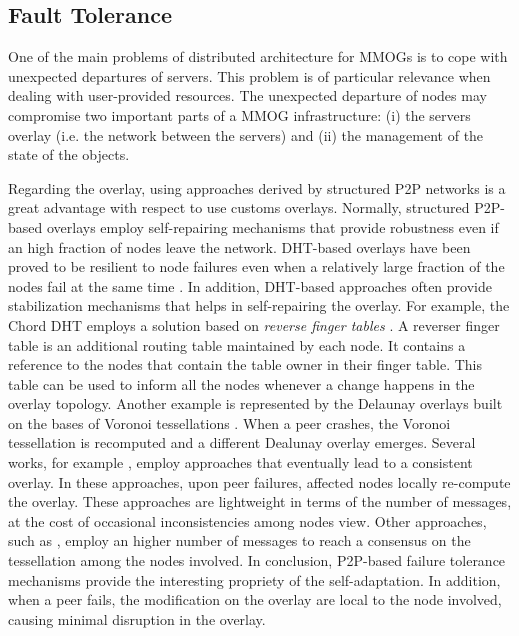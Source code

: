 \documentclass[final,10pt,a5paper]{phdimt}
\theoremstyle{definition}
\begin{document}
\subsection{Fault Tolerance}

One of the main problems of distributed architecture for MMOGs is to cope with unexpected departures of servers.
This problem is of particular relevance when dealing with user-provided resources.
The unexpected departure of nodes may compromise two important parts of a MMOG infrastructure: (i) the servers overlay (i.e. the network between the servers) and (ii) the management of the state of the objects.

Regarding the overlay, using approaches derived by structured P2P networks is a great advantage with respect to use customs overlays.
Normally, structured P2P-based overlays  employ self-repairing mechanisms that provide robustness even if an high fraction of nodes leave the network. DHT-based overlays have been proved to be resilient to node failures even when a relatively large fraction of the nodes fail at the same time \cite{rowstron2001pastry,kuhn2005self}. In addition, DHT-based approaches often provide stabilization mechanisms that helps in self-repairing the overlay.
For example, the Chord DHT \cite{Stoica2003} employs a solution based on \textit{reverse finger tables} \cite{chen2008towards}. 
A reverser finger table is an additional routing table maintained by each node. It contains a reference to the nodes that contain the table owner in their finger table. This table can be used to inform all the nodes whenever  a change happens in the overlay topology. 
Another example is represented by the Delaunay overlays  built on the bases of Voronoi tessellations \cite{Aurenhammer}. When a peer crashes, the Voronoi tessellation is recomputed and a different Dealunay overlay emerges.
Several works, for example \cite{baragliagodel}, employ approaches that eventually lead to a consistent overlay. 
In these approaches, upon peer failures, affected nodes locally re-compute the overlay.
These approaches are lightweight in terms of the number of messages, at the cost of occasional inconsistencies among nodes view. Other approaches, such as \cite{liebeherr2002application}, employ an higher number of messages to reach a consensus on the tessellation among the nodes involved.
In conclusion, P2P-based failure tolerance mechanisms provide the interesting propriety of the self-adaptation.
In addition, when a peer fails, the modification on the overlay are local to the node involved, causing minimal disruption in the overlay.
\end{document}

